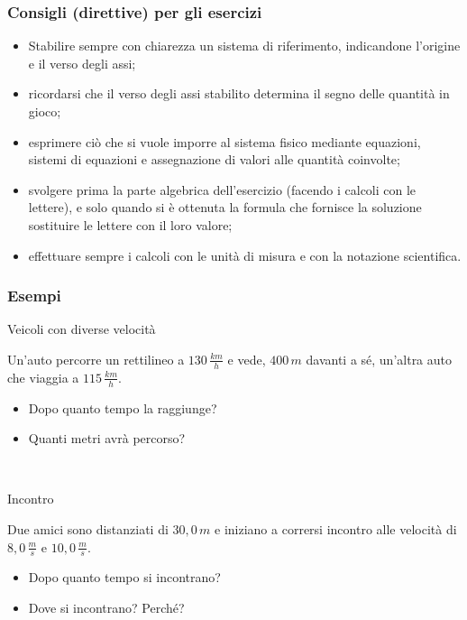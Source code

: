 \documentclass[]{beamer}
\theoremstyle{plain}
\begin{document}
\begin{frame}
  \frametitle{Consigli (direttive) per gli esercizi}
  
  \begin{itemize}
    \item Stabilire sempre con chiarezza un \alert{sistema di riferimento}, indicandone l'origine e il verso degli assi;\pause
    \item ricordarsi che il verso degli assi stabilito determina il \alert{segno} delle quantità in gioco;\pause
    \item esprimere ciò che si vuole imporre al sistema fisico mediante equazioni, sistemi di equazioni e assegnazione di valori alle quantità coinvolte;\pause
    \item svolgere \alert{prima} la parte algebrica dell'esercizio (facendo i calcoli con le lettere), e solo quando si è ottenuta la formula che fornisce la soluzione sostituire le lettere con il loro valore;\pause
    \item effettuare sempre i calcoli con le \alert{unità di misura} e con la \alert{notazione scientifica}.
  \end{itemize}
\end{frame}


\begin{frame}
\frametitle{Esempi}
\begin{exampleblock}{Veicoli con diverse velocità}
\begin{small}
Un'auto percorre un rettilineo a $ 130 \, \frac{km}{h} $ e vede, $ 400 \, m $ davanti a sé, un'altra auto che viaggia a $ 115 \, \frac{km}{h} $.
\begin{itemize}
  \item Dopo quanto tempo la raggiunge?
  \item Quanti metri avrà percorso?
\end{itemize}
\end{small}
\end{exampleblock}

~

\begin{exampleblock}{Incontro}
\begin{small}
Due amici sono distanziati di $ 30,0 \, m $ e iniziano a corrersi incontro alle velocità di $ 8,0 \, \frac{m}{s} $ e $ 10,0 \, \frac{m}{s} $.
\begin{itemize}
  \item Dopo quanto tempo si incontrano?
  \item Dove si incontrano? Perché?
\end{itemize}
\end{small}
\end{exampleblock}
\end{frame}
\end{document}

